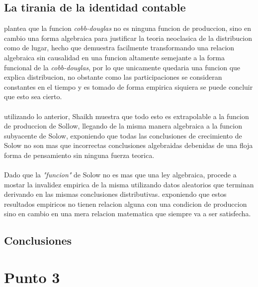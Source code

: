 \documentclass[11pt]{article}
\begin{document}
\begin{flushleft}
    \subsection{La tirania de la identidad contable}
    \citet{shaikh_1974} plantea que la funcion \textit{cobb-douglas} no es ninguna funcion de produccion, 
    sino en cambio una forma algebraica para justificar la teoria neoclasica de la distribucion como de lugar,
    hecho que demuestra facilmente transformando una relacion algebraica sin causalidad en una funcion altamente
    semejante a la forma funcional de la \textit{cobb-douglas}, por lo que unicamente quedaria
    una funcion que explica distribucion, no obstante como las participaciones se consideran
    constantes en el tiempo y es tomado de forma empirica siquiera se puede concluir que esto sea cierto.
    \\~\\
    utilizando lo anterior, Shaikh muestra que todo esto es extrapolable a la funcion de produccion de Sollow,
    llegando de la misma manera algebraica a la funcion subyacente de Solow, exponiendo que todas las conclusiones
    de crecimiento de Solow no son mas que incorrectas conclusiones algebraidas debenidas de una floja forma de pensamiento sin ninguna fuerza teorica.
    \\~\\
    Dado que la \textit{"funcion"} de Solow no es mas que una ley algebraica, procede a mostar la invalidez empirica de la misma utilizando datos aleatorios
    que terminan derivando en las mismas conclusiones distributivas. exponiendo que estos resultados empiricos no tienen relacion alguna con 
    una condicion de produccion sino en cambio en una mera relacion matematica que siempre va a ser satisfecha.
    
    \subsection{Conclusiones}

    


\end{flushleft}

\newpage

\section{Punto 3}

\begin{flushleft}
    ~\\
\end{flushleft}

\newpage

\medskip

 

\newpage
\end{document}

